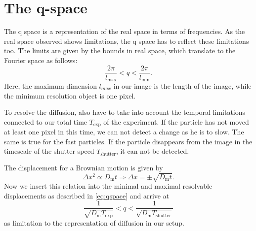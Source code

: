 \section{The q-space}
\label{sec:qSpace}

The q space is a representation of the real space in terms of frequencies. As the real space observed shows limitations, 
the q space has to reflect these limitations too. The limits are given by the bounds in real space, which translate to the 
Fourier space as follows:
\begin{equation}
    \frac{2\pi}{l_{\mathrm{max}}}<q < \frac{2\pi}{l_{\mathrm{min}}}.
    \label{eq:qspace}
\end{equation}
Here, the maximum dimension $l_{max}$ in our image is the length of the image, while the minimum resolution object is one pixel. 

To resolve the diffusion, also have to take into account the temporal limitations connected to our total time $T_{\mathrm{exp}}$ of the experiment. If the 
particle has not moved at least one pixel in this time, we can not detect a change as he is to slow. The same is true for the fast particles. If the particle
disappears from the image in the timescale of the shutter speed $T_{\mathrm{shutter}} $, it can not be detected.  

The displacement for a Brownian motion is given by 
\begin{equation}
    \Delta x^2 \propto  D_{\mathrm{m}} t   \Rightarrow \Delta x = \pm \sqrt{D_{\mathrm{m}} t}.
\end{equation}
Now we insert this relation into the minimal and maximal resolvable displacements as described in \cref{eq:qspace} and arrive at 
\begin{equation}
    \frac{1}{\sqrt{D_{\mathrm{m}} T_{\mathrm{exp}}}} < q < \frac{1}{\sqrt{D_{\mathrm{m}} T_{\mathrm{shutter}}}}
\end{equation}
as limitation to the representation of diffusion in our setup. 